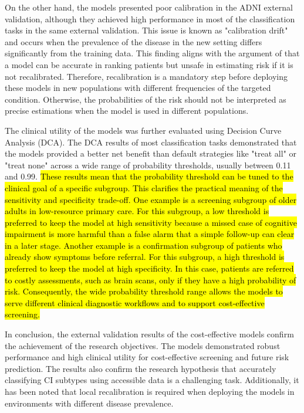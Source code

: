 On the other hand, the models presented poor calibration in the ADNI external validation, although they achieved high performance in most of the classification tasks in the same external validation. This issue is known as "calibration drift" and occurs when the prevalence of the disease in the new setting differs significantly from the training data. This finding aligns with the argument of \cite{VanCalster2019Calibration} that a model can be accurate in ranking patients but unsafe in estimating risk if it is not recalibrated. Therefore, recalibration is a mandatory step before deploying these models in new populations with different frequencies of the targeted condition. Otherwise, the probabilities of the risk should not be interpreted as precise estimations when the model is used in different populations.

The clinical utility of the models was further evaluated using Decision Curve Analysis (\acrshort{DCA}). The DCA results of most classification tasks demonstrated that the models provided a better net benefit than default strategies like "treat all" or "treat none" across a wide range of probability thresholds, usually between 0.11 and 0.99. \hl{These results mean that the probability threshold can be tuned to the clinical goal of a specific subgroup. This clarifies the practical meaning of the sensitivity and specificity trade-off. One example is a screening subgroup of older adults in low-resource primary care. For this subgroup, a low threshold is preferred to keep the model at high sensitivity because a missed case of cognitive impairment is more harmful than a false alarm that a simple follow-up can clear in a later stage. Another example is a confirmation subgroup of patients who already show symptoms before referral. For this subgroup, a high threshold is preferred to keep the model at high specificity. In this case, patients are referred to costly assessments, such as brain scans, only if they have a high probability of risk. Consequently, the wide probability threshold range allows the models to serve different clinical diagnostic workflows and to support cost-effective screening.}

In conclusion, the external validation results of the cost-effective models confirm the achievement of the research objectives. The models demonstrated robust performance and high clinical utility for cost-effective screening and future risk prediction. The results also confirm the research hypothesis that accurately classifying CI subtypes using accessible data is a challenging task. Additionally, it has been noted that local recalibration is required when deploying the models in environments with different disease prevalence.

